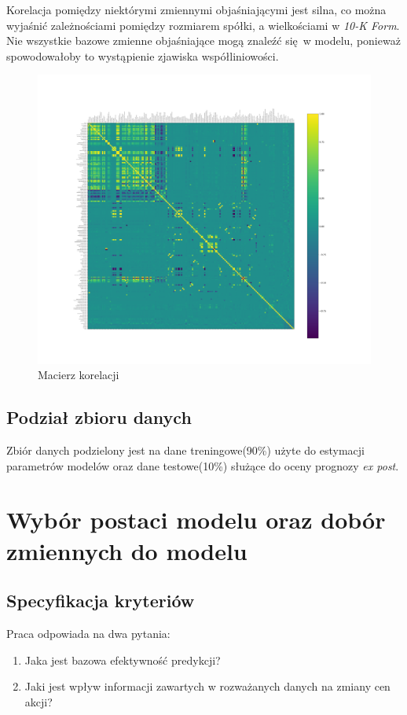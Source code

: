 \documentclass{article}
\begin{document}
\newpage
Korelacja pomiędzy niektórymi zmiennymi objaśniającymi jest silna, co można wyjaśnić zależnościami pomiędzy rozmiarem spółki, a wielkościami w \textit{10-K Form}. Nie wszystkie bazowe zmienne objaśniające mogą znaleźć się w modelu, ponieważ spowodowałoby to wystąpienie zjawiska współliniowości.
\begin{figure}[h!]
    \includegraphics[width=\linewidth]{source/CorrelationMatrix.png}
    \caption{Macierz korelacji}
\end{figure}

\subsection{Podział zbioru danych}
Zbiór danych podzielony jest na dane treningowe(90\%) użyte do estymacji parametrów modelów oraz dane testowe(10\%) służące do oceny prognozy \textit{ex post}.

\newpage
\section{Wybór postaci modelu oraz dobór zmiennych do modelu}
\subsection{Specyfikacja kryteriów}
Praca odpowiada na dwa pytania:
\begin{enumerate}
    \item Jaka jest bazowa efektywność predykcji?
    \item Jaki jest wpływ informacji zawartych w rozważanych danych na zmiany cen akcji?
\end{enumerate}
\end{document}
